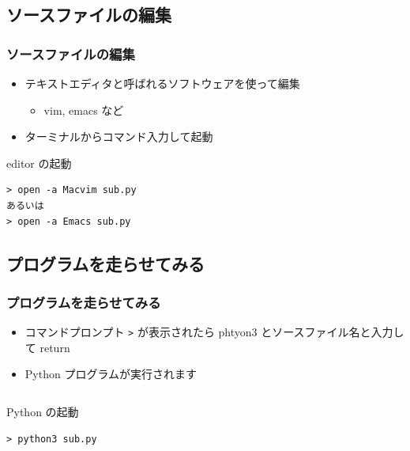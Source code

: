 \subsection{ソースファイルの編集}
\begin{frame}[containsverbatim]
\frametitle{ソースファイルの編集}
  \begin{itemize}
\item テキストエディタと呼ばれるソフトウェアを使って編集
    \begin{itemize}
\item vim, emacs など
    \end{itemize}
\item ターミナルからコマンド入力して起動
  \end{itemize}
  \begin{itembox}{editor の起動}
\scriptsize
    \begin{verbatim}
> open -a Macvim sub.py
あるいは
> open -a Emacs sub.py
    \end{verbatim}
  \end{itembox}
\end{frame}
%
%
\subsection{プログラムを走らせてみる}
\begin{frame}[containsverbatim]
\frametitle{プログラムを走らせてみる}
  \begin{itemize}
\item コマンドプロンプト \verb|>| が表示されたら phtyon3 とソースファイル名と入力して return 
\item Python プログラムが実行されます
  \end{itemize}
  \begin{columns}
    \begin{column}{0.5\textwidth}
      \begin{itembox}{\footnotesize Python の起動}
\scriptsize
        \begin{verbatim}
> python3 sub.py
        \end{verbatim}
      \end{itembox}
    \end{column}
  \end{columns}
\end{frame}
